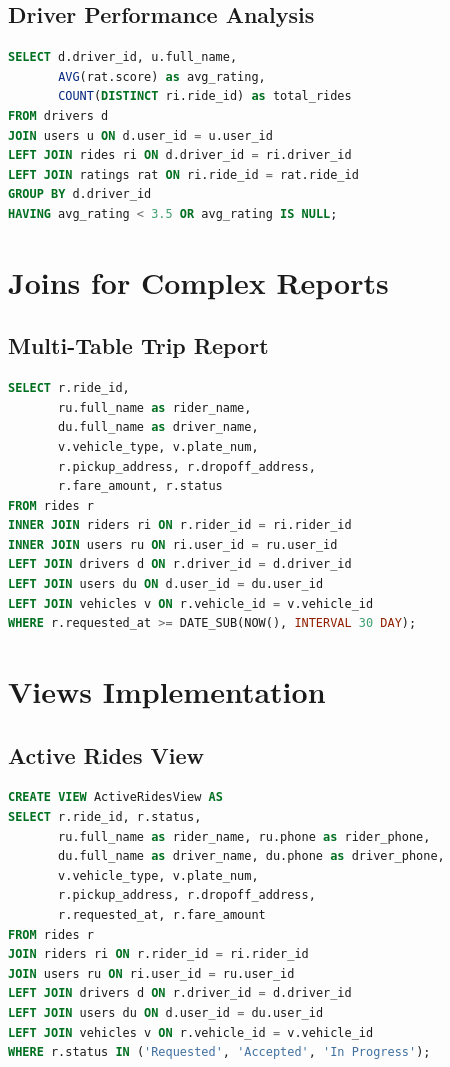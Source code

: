 \documentclass[12pt,a4paper]{report}
\begin{document}
\subsection{Driver Performance Analysis}

\begin{lstlisting}[language=SQL, caption={Drivers with low ratings requiring attention}]
SELECT d.driver_id, u.full_name, 
       AVG(rat.score) as avg_rating,
       COUNT(DISTINCT ri.ride_id) as total_rides
FROM drivers d
JOIN users u ON d.user_id = u.user_id
LEFT JOIN rides ri ON d.driver_id = ri.driver_id
LEFT JOIN ratings rat ON ri.ride_id = rat.ride_id
GROUP BY d.driver_id
HAVING avg_rating < 3.5 OR avg_rating IS NULL;
\end{lstlisting}

\section{Joins for Complex Reports}

\subsection{Multi-Table Trip Report}

\begin{lstlisting}[language=SQL, caption={Complete trip report with all details}]
SELECT r.ride_id,
       ru.full_name as rider_name,
       du.full_name as driver_name,
       v.vehicle_type, v.plate_num,
       r.pickup_address, r.dropoff_address,
       r.fare_amount, r.status
FROM rides r
INNER JOIN riders ri ON r.rider_id = ri.rider_id
INNER JOIN users ru ON ri.user_id = ru.user_id
LEFT JOIN drivers d ON r.driver_id = d.driver_id
LEFT JOIN users du ON d.user_id = du.user_id
LEFT JOIN vehicles v ON r.vehicle_id = v.vehicle_id
WHERE r.requested_at >= DATE_SUB(NOW(), INTERVAL 30 DAY);
\end{lstlisting}

\section{Views Implementation}

\subsection{Active Rides View}

\begin{lstlisting}[language=SQL, caption={ActiveRidesView - Real-time monitoring}]
CREATE VIEW ActiveRidesView AS
SELECT r.ride_id, r.status,
       ru.full_name as rider_name, ru.phone as rider_phone,
       du.full_name as driver_name, du.phone as driver_phone,
       v.vehicle_type, v.plate_num,
       r.pickup_address, r.dropoff_address,
       r.requested_at, r.fare_amount
FROM rides r
JOIN riders ri ON r.rider_id = ri.rider_id
JOIN users ru ON ri.user_id = ru.user_id
LEFT JOIN drivers d ON r.driver_id = d.driver_id
LEFT JOIN users du ON d.user_id = du.user_id
LEFT JOIN vehicles v ON r.vehicle_id = v.vehicle_id
WHERE r.status IN ('Requested', 'Accepted', 'In Progress');
\end{lstlisting}
\end{document}

